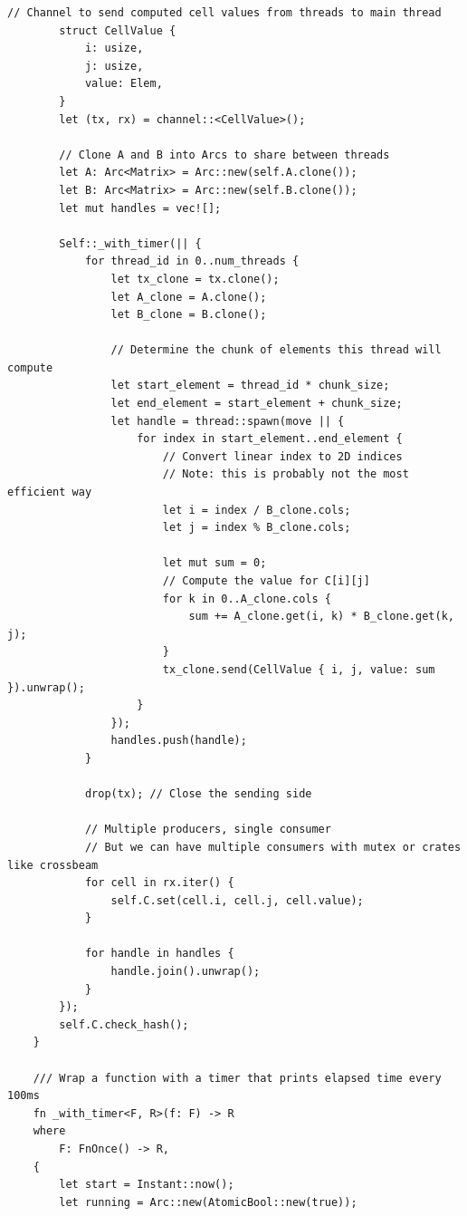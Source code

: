 \documentclass[a4paper, 14pt]{extarticle}
\begin{document}
\begin{lstlisting}[caption={Исходный код программы}, label={lst:source_code}]
        // Channel to send computed cell values from threads to main thread
        struct CellValue {
            i: usize,
            j: usize,
            value: Elem,
        }
        let (tx, rx) = channel::<CellValue>();

        // Clone A and B into Arcs to share between threads
        let A: Arc<Matrix> = Arc::new(self.A.clone());
        let B: Arc<Matrix> = Arc::new(self.B.clone());
        let mut handles = vec![];

        Self::_with_timer(|| {
            for thread_id in 0..num_threads {
                let tx_clone = tx.clone();
                let A_clone = A.clone();
                let B_clone = B.clone();

                // Determine the chunk of elements this thread will compute
                let start_element = thread_id * chunk_size;
                let end_element = start_element + chunk_size;
                let handle = thread::spawn(move || {
                    for index in start_element..end_element {
                        // Convert linear index to 2D indices
                        // Note: this is probably not the most efficient way
                        let i = index / B_clone.cols;
                        let j = index % B_clone.cols;

                        let mut sum = 0;
                        // Compute the value for C[i][j]
                        for k in 0..A_clone.cols {
                            sum += A_clone.get(i, k) * B_clone.get(k, j);
                        }
                        tx_clone.send(CellValue { i, j, value: sum }).unwrap();
                    }
                });
                handles.push(handle);
            }

            drop(tx); // Close the sending side

            // Multiple producers, single consumer
            // But we can have multiple consumers with mutex or crates like crossbeam
            for cell in rx.iter() {
                self.C.set(cell.i, cell.j, cell.value);
            }

            for handle in handles {
                handle.join().unwrap();
            }
        });
        self.C.check_hash();
    }

    /// Wrap a function with a timer that prints elapsed time every 100ms
    fn _with_timer<F, R>(f: F) -> R
    where
        F: FnOnce() -> R,
    {
        let start = Instant::now();
        let running = Arc::new(AtomicBool::new(true));


\end{lstlisting}
\end{document}
